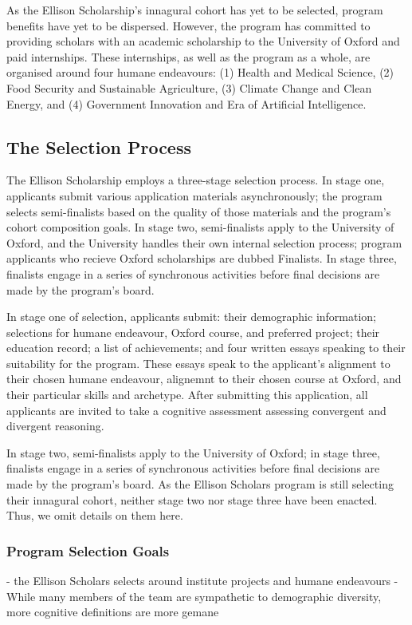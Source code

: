 As the Ellison Scholarship's innagural cohort has yet to be selected, program benefits have yet to be dispersed. However, the program has committed to providing scholars with an academic scholarship to the University of Oxford and paid internships. These internships, as well as the program as a whole, are organised around four humane endeavours: (1) Health and Medical Science, (2) Food Security and Sustainable Agriculture, (3) Climate Change and Clean Energy, and (4) Government Innovation and Era of Artificial Intelligence.

\subsection{The Selection Process}
The Ellison Scholarship employs a three-stage selection process. In stage one, applicants submit various application materials asynchronously; the program selects semi-finalists based on the quality of those materials and the program's cohort composition goals. In stage two, semi-finalists apply to the University of Oxford, and the University handles their own internal selection process; program applicants who recieve Oxford scholarships are dubbed Finalists. In stage three, finalists engage in a series of synchronous activities before final decisions are made by the program's board. 

In stage one of selection, applicants submit: their demographic information; selections for humane endeavour, Oxford course, and preferred project; their education record; a list of achievements; and four written essays speaking to their suitability for the program. These essays speak to the applicant's alignment to their chosen humane endeavour, alignemnt to their chosen course at Oxford, and their particular skills and archetype. After submitting this application, all applicants are invited to take a cognitive assessment assessing convergent and divergent reasoning.

In stage two, semi-finalists apply to the University of Oxford; in stage three, finalists engage in a series of synchronous activities before final decisions are made by the program's board. As the Ellison Scholars program is still selecting their innagural cohort, neither stage two nor stage three have been enacted. Thus, we omit details on them here. 

\subsubsection{Program Selection Goals}
- the Ellison Scholars selects around institute projects and humane endeavours
- While many members of the team are sympathetic to demographic diversity, more cognitive definitions are more gemane

